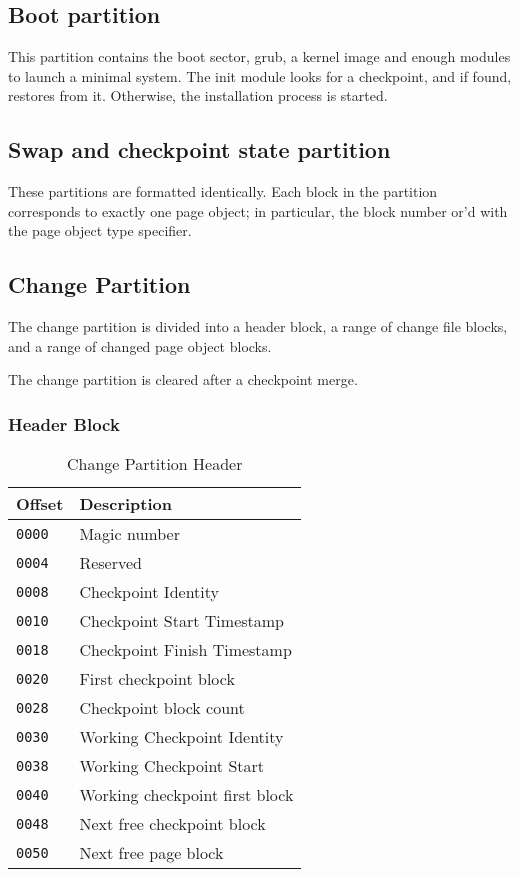 \subsection{Boot partition}

This partition contains the boot sector, grub, a kernel image and enough modules to launch a minimal system.  The init module looks for a checkpoint, and if found, restores from it.  Otherwise, the installation process is started.

\subsection{Swap and checkpoint state partition}

These partitions are formatted identically.  Each block in the partition corresponds to exactly one page object; in particular,  the block number or'd with the page object type specifier.

\subsection{Change Partition}

The change partition is divided into a header block, a range of change file blocks, and a range of changed page object blocks.

The change partition is cleared after a checkpoint merge.

\subsubsection{Header Block}

\begin{table}[ht]
\begin{tabular}{l l}
\hline\hline
Offset &  Description \\
\hline
{\tt 0000} & Magic number \\
{\tt 0004} & Reserved \\
{\tt 0008} & Checkpoint Identity \\
{\tt 0010} & Checkpoint Start Timestamp \\
{\tt 0018} & Checkpoint Finish Timestamp \\
{\tt 0020} & First checkpoint block \\
{\tt 0028} & Checkpoint block count \\
{\tt 0030} & Working Checkpoint Identity \\
{\tt 0038} & Working Checkpoint Start \\
{\tt 0040} & Working checkpoint first block \\
{\tt 0048} & Next free checkpoint block \\
{\tt 0050} & Next free page block \\
\hline
\end{tabular}
\caption{Change Partition Header}
\label{table:change-partition-header}
\end{table}

